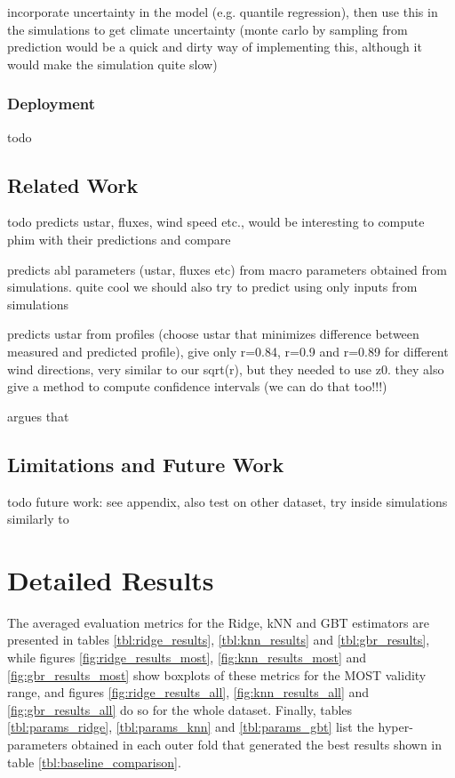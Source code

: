 \documentclass[a4paper]{book}
\begin{document}
incorporate uncertainty in the model (e.g. quantile regression), then use this in the simulations to get climate uncertainty (monte carlo by sampling from prediction would be a quick and dirty way of implementing this, although it would make the simulation quite slow)

\subsection{Deployment}
todo

\section{Related Work}
todo
\citep{cabauw_preds} predicts ustar, fluxes, wind speed etc., would be interesting to compute phim with their predictions and compare

\citep{predict_micro_from_macro_sim} predicts abl parameters (ustar, fluxes etc) from macro parameters obtained from simulations. quite cool we should also try to predict using only inputs from simulations

\citep{ustar_from_profile} predicts ustar from profiles (choose ustar that minimizes difference between measured and predicted profile), give only r=0.84, r=0.9 and r=0.89 for different wind directions, very similar to our sqrt(r), but they needed to use z0. they also give a method to compute confidence intervals (we can do that too!!!)


\citep{flux_prof_measure_issues} argues that 

\section{Limitations and Future Work}
todo
future work: see appendix, also test on other dataset, try inside simulations similarly to \citep{predict_micro_from_macro_sim}

\appendix
\chapter{Detailed Results}
\label{apx:all_results}
The averaged evaluation metrics for the Ridge, kNN and GBT estimators are presented in tables \ref{tbl:ridge_results}, \ref{tbl:knn_results}
and \ref{tbl:gbr_results}, while figures \ref{fig:ridge_results_most}, \ref{fig:knn_results_most} and \ref{fig:gbr_results_most} show boxplots of these metrics for the MOST validity range, and figures \ref{fig:ridge_results_all}, \ref{fig:knn_results_all} and \ref{fig:gbr_results_all} do so for the whole dataset. Finally, tables \ref{tbl:params_ridge}, \ref{tbl:params_knn} and \ref{tbl:params_gbt} list the hyper-parameters obtained in each outer fold that generated the best results shown in table \ref{tbl:baseline_comparison}.
\end{document}
